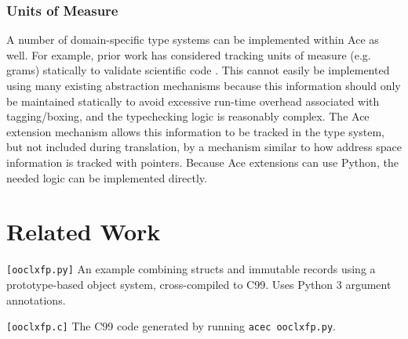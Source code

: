 \documentclass[9pt,preprint]{sigplanconf}
\begin{document}
\subsubsection{Units of Measure}
A number of domain-specific type systems can be implemented within Ace as well. For example, prior work has considered tracking units of measure (e.g. grams) statically to validate scientific code \cite{conf/cefp/Kennedy09}. This cannot easily be implemented using many existing abstraction mechanisms because this information should only be maintained statically to avoid excessive run-time overhead associated with tagging/boxing, and the typechecking logic is reasonably complex. The Ace extension mechanism allows this information to be tracked in the type system, but not included during translation, by a mechanism similar to how address space information is tracked with pointers. Because Ace extensions can use Python, the needed logic can be implemented directly.

\section{Related Work}\label{related}
\begin{codelisting}[t]

\caption{\texttt{[ooclxfp.py]} An example combining structs and immutable records using a prototype-based object system, cross-compiled to C99. Uses Python 3 argument annotations.}
\label{ooclxfppy}
\end{codelisting}
\begin{codelisting}[t]

\caption{\texttt{[ooclxfp.c]} The C99 code generated by running \texttt{acec ooclxfp.py}.}
\label{ooclxfpc}
\end{codelisting}
\end{document}
